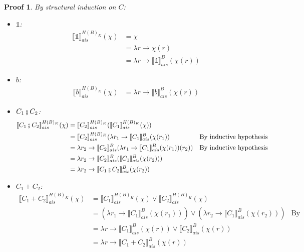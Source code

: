 \documentclass{article}
\newtheorem{proofs}{Proof}
\def\rr{\rightarrow}
\newcommand*{\sem}[1]{
    \llbracket #1 \rrbracket
}
\newcommand{\bca}[2]{
    #2_{ais}^{#1}
}
\newcommand{\bsem}[2][A]{
    \bca{#1}{\sem{#2}}
}
\def\fcmp{\mathbin{\raise 0.6ex\hbox{\oalign{\hfil$\scriptscriptstyle      
    \mathrm{o}$\hfil\cr\hfil$\scriptscriptstyle\mathrm{9}$\hfil}}}}
\def\rr{\rightarrow}
\begin{document}
    \begin{proofs}
        By structural induction on $C$:
        \begin{itemize}
            \item $\mathbb{1}$:
                \begin{align*}
                    \bsem[H(B)_K]{\mathbb{1}}(\chi) 
                        &= \chi \\
                        &= \lambda r \rr \chi(r) \\
                        &= \lambda r \rr \bsem[B]{\mathbb{1}}(\chi(r))
                \end{align*}

            \item $b$:
                \begin{align*}
                    \bsem[H(B)_K]{b}(\chi) 
                        &= \lambda r \rr \bsem[B]{b}(\chi(r))
                \end{align*}

            \item $C_1 \fcmp C_2$:
                \begin{align*}
                    \bsem[H(B)_K]{C_1 \fcmp C_2}(\chi) 
                        &= \bsem[H(B)_K]{C_2}(\bsem[H(B)_K]{C_1}(\chi)) \\
                        &= \bsem[H(B)_K]{C_2}(\lambda r_1 \rr 
                            \bsem[B]{C_1}(\chi(r_1))
                        &\text{By inductive hypothesis} \\
                        &= \lambda r_2 \rr \bsem[B]{C_2}(\lambda r_1 \rr 
                            \bsem[B]{C_1}(\chi(r_1))(r_2))
                        &\text{By inductive hypothesis} \\
                        &= \lambda r_2 \rr 
                            \bsem[B]{C_2}(\bsem[B]{C_1}(\chi(r_2))) \\
                        &= \lambda r_2 \rr \bsem[B]{C_1 \fcmp C_2}(\chi(r_2)) \\
                \end{align*}

            \item $C_1 + C_2$:
                \begin{align*}
                    \bsem[H(B)_K]{C_1 + C_2}(\chi)
                        &= \bsem[H(B)_K]{C_1}(\chi) 
                            \lor \bsem[H(B)_K]{C_2}(\chi) \\
                        &= (\lambda r_1 \rr \bsem[B]{C_1}(\chi(r_1)))
                            \lor (\lambda r_2 \rr \bsem[B]{C_1}(\chi(r_2)))
                        &\text{By inductive hypothesis} \\
                        &= \lambda r \rr \bsem[B]{C_1}(\chi(r))
                            \lor \bsem[B]{C_2}(\chi(r)) \\
                        &= \lambda r \rr \bsem[B]{C_1 + C_2}(\chi(r))
                \end{align*}


\end{itemize}
\end{proofs}
\end{document}
